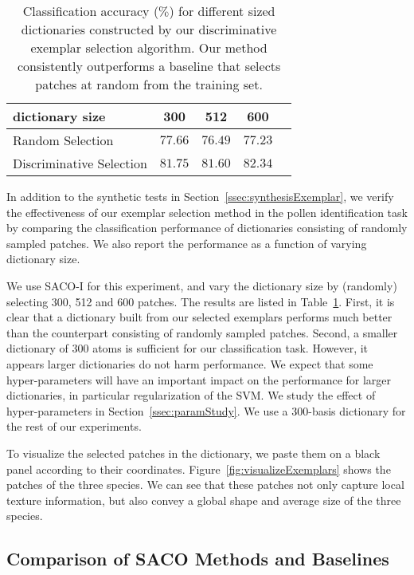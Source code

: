 \documentclass[10pt,twocolumn,letterpaper]{article}
\begin{document}
\begin{table}[t]
\small
\centering
\begin{tabular}{|l|c|c|c|c|}
\hline
dictionary size                        &	300      &		512 & 600          \\
\hline
Random Selection & $77.66$     &$76.49$ & $77.23$       \\
\hline
Discriminative Selection & $81.75$     &$81.60$ & $82.34$       \\
\hline
\end{tabular}
\caption{Classification accuracy ($\%$) for different sized dictionaries
constructed by our discriminative exemplar selection algorithm. Our method
consistently outperforms a baseline that selects patches at random from
the training set.}
\label{tab:acc_vs_dictSize}
\vspace{-3mm}
\end{table}



In addition to the synthetic tests in Section~\ref{ssec:synthesisExemplar}, we
verify the effectiveness of our exemplar selection method in the pollen
identification task by comparing the classification performance of dictionaries
consisting of randomly sampled patches. We also report the performance as a
function of varying dictionary size.

We use SACO-I for this experiment, and vary the dictionary size by (randomly)
selecting 300, 512 and 600 patches.  The results are listed in
Table~\ref{tab:acc_vs_dictSize}.  First, it is clear that a dictionary built
from our selected exemplars performs much better than the counterpart
consisting of randomly sampled patches.  Second, a smaller dictionary of 300
atoms is sufficient for our classification task.  However, it appears larger
dictionaries do not harm performance.  We expect that some hyper-parameters
will have an important impact on the performance for larger dictionaries, in
particular regularization of the SVM.  We study the effect of hyper-parameters
in Section~\ref{ssec:paramStudy}.  We use a 300-basis dictionary for the rest
of our experiments.

To visualize the selected patches in the dictionary, we paste them on a black
panel according to their coordinates.  Figure~\ref{fig:visualizeExemplars}
shows the patches of the three species.  We can see that these patches not only
capture local texture information, but also convey a global shape and average
size of the three species.


\subsection{Comparison of SACO Methods and Baselines}
\label{ssec:twoVariants}
\end{document}
